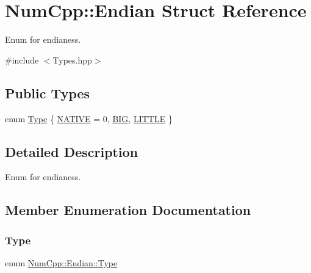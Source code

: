 \hypertarget{struct_num_cpp_1_1_endian}{}\section{Num\+Cpp\+:\+:Endian Struct Reference}
\label{struct_num_cpp_1_1_endian}


Enum for endianess.  




{\ttfamily \#include $<$Types.\+hpp$>$}

\subsection*{Public Types}
\begin{DoxyCompactItemize}
\item 
enum \mbox{\hyperlink{struct_num_cpp_1_1_endian_a4b4f3e02f68302be202402f5d5501445}{Type}} \{ \mbox{\hyperlink{struct_num_cpp_1_1_endian_a4b4f3e02f68302be202402f5d5501445af10d74f29f26ec78c2dd20f261b53393}{N\+A\+T\+I\+VE}} = 0, 
\mbox{\hyperlink{struct_num_cpp_1_1_endian_a4b4f3e02f68302be202402f5d5501445a2686ec00d19b57046a96f1deaad752b1}{B\+IG}}, 
\mbox{\hyperlink{struct_num_cpp_1_1_endian_a4b4f3e02f68302be202402f5d5501445a3780bfee173d3fac475120f9e6c2f60c}{L\+I\+T\+T\+LE}}
 \}
\end{DoxyCompactItemize}


\subsection{Detailed Description}
Enum for endianess. 

\subsection{Member Enumeration Documentation}
\mbox{\label{struct_num_cpp_1_1_endian_a4b4f3e02f68302be202402f5d5501445}} 
\subsubsection{\texorpdfstring{Type}{Type}}
{\footnotesize\ttfamily enum \mbox{\hyperlink{struct_num_cpp_1_1_endian_a4b4f3e02f68302be202402f5d5501445}{Num\+Cpp\+::\+Endian\+::\+Type}}}

